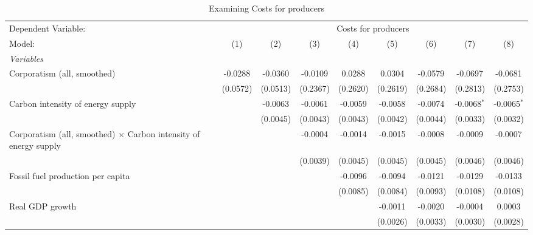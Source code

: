 
\begin{table}[htbp]
   \caption{Examining Costs for producers}
   \centering
   \begin{tabular}{lcccccccc}
      \tabularnewline \midrule \midrule
      Dependent Variable: & \multicolumn{8}{c}{Costs for producers}\\
      Model:                                                                  & (1)      & (2)      & (3)      & (4)      & (5)      & (6)      & (7)           & (8)\\  
      \midrule
      \emph{Variables}\\
      Corporatism (all, smoothed)                                             & -0.0288  & -0.0360  & -0.0109  & 0.0288   & 0.0304   & -0.0579  & -0.0697       & -0.0681\\   
                                                                              & (0.0572) & (0.0513) & (0.2367) & (0.2620) & (0.2619) & (0.2684) & (0.2813)      & (0.2753)\\   
      Carbon intensity of energy supply                                       &          & -0.0063  & -0.0061  & -0.0059  & -0.0058  & -0.0074  & -0.0068$^{*}$ & -0.0065$^{*}$\\   
                                                                              &          & (0.0045) & (0.0043) & (0.0043) & (0.0042) & (0.0044) & (0.0033)      & (0.0032)\\   
      Corporatism (all, smoothed) $\times$ Carbon intensity of energy supply  &          &          & -0.0004  & -0.0014  & -0.0015  & -0.0008  & -0.0009       & -0.0007\\   
                                                                              &          &          & (0.0039) & (0.0045) & (0.0045) & (0.0045) & (0.0046)      & (0.0046)\\   
      Fossil fuel production per capita                                       &          &          &          & -0.0096  & -0.0094  & -0.0121  & -0.0129       & -0.0133\\   
                                                                              &          &          &          & (0.0085) & (0.0084) & (0.0093) & (0.0108)      & (0.0108)\\   
      Real GDP growth                                                         &          &          &          &          & -0.0011  & -0.0020  & -0.0004       & 0.0003\\   
                                                                              &          &          &          &          & (0.0026) & (0.0033) & (0.0030)      & (0.0028)\\   

\end{tabular}
\end{table}
